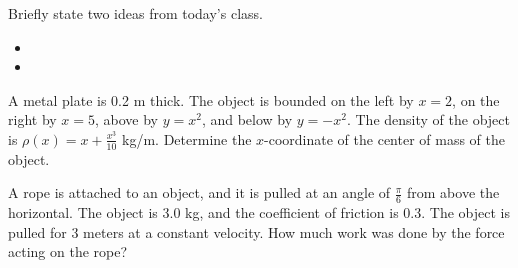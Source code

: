 \postClass

\begin{problem}
\item Briefly state two ideas from today's class.
  \begin{itemize}
  \item
  \item
  \end{itemize}
\item A metal plate is 0.2 m thick. The object is bounded on the left by
  $x=2$, on the right by $x=5$, above by $y=x^2$, and below by
  $y=-x^2$. The density of the object is $\rho(x)=x+\frac{x^3}{10}$
  kg/m. Determine the $x$-coordinate of the center of mass of the
  object.
    \vfill
    \clearpage
\end{problem}



\begin{problem}
\item A rope is attached to an object, and it is pulled at an angle of
  $\frac{\pi}{6}$ from above the horizontal. The object is 3.0 kg, and
  the coefficient of friction is 0.3. The object is pulled for 3
  meters at a constant velocity. How much work was done by the force
  acting on the rope?

  \vfill
\end{problem}


